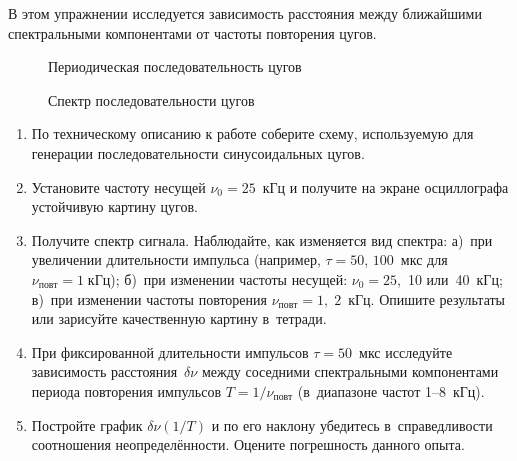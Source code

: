 \begin{lab:task}

В этом упражнении исследуется зависимость расстояния между ближайшими
спектральными компонентами от частоты повторения цугов.

\begin{figure}[h!]
\hfil\hfil
\begin{minipage}{0.4\textwidth}
    \caption{Периодическая последовательность цугов}
\end{minipage}
\hfil
\begin{minipage}{0.4\textwidth}
    \caption{Спектр последовательности цугов}
\end{minipage}
\end{figure}


\begin{enumerate}

\item По техническому описанию к работе соберите схему, используемую
для генерации последовательности синусоидальных цугов.

\item Установите частоту несущей $\nu_0=25$~кГц и получите на экране осциллографа
устойчивую картину цугов.

\item Получите спектр сигнала. Наблюдайте, как изменяется вид спектра:
а)~при увеличении длительности импульса (например, $\tau=50$, $100$~мкс
для $\nu_\text{повт}=1\;кГц$); б)~при изменении частоты несущей:
$\nu_0=25$,~10 или~40~кГц; в)~при изменении частоты повторения
$\nu_{повт}=1,\;2$~кГц. Опишите результаты или зарисуйте качественную
картину в~тетради.

\item При фиксированной длительности импульсов $\tau=50$~мкс исследуйте
зависимость расстояния~$\delta \nu$ между соседними спектральными компонентами
периода повторения импульсов $T=1/\nu_\text{повт}$
(в~диапазоне частот 1--8~кГц).

\item Постройте график $\delta \nu(1/T)$ и по его наклону
убедитесь в~справедливости соотношения неопределённости.
Оцените погрешность данного опыта.

\end{enumerate}


\end{lab:task}
